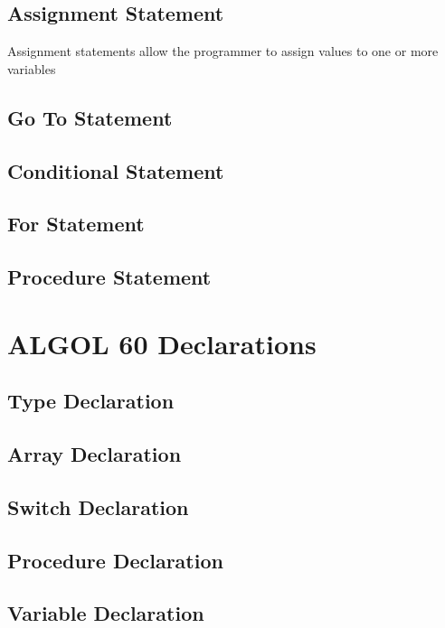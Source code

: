 \documentclass{article}
\begin{document}
\subsection{Assignment Statement} \label{assigStat}
Assignment statements allow the programmer to assign values to one or more variables

\subsection{Go To Statement}

\subsection{Conditional Statement}

\subsection{For Statement}

\subsection{Procedure Statement}

\newpage

\section{ALGOL 60 Declarations}

\subsection{Type Declaration} \label{typeDecl}

\subsection{Array Declaration} \label{arrayDecl}

\subsection{Switch Declaration} \label{switchDecl}

\subsection{Procedure Declaration} \label{procDecl}

\subsection{Variable Declaration}
\end{document}
